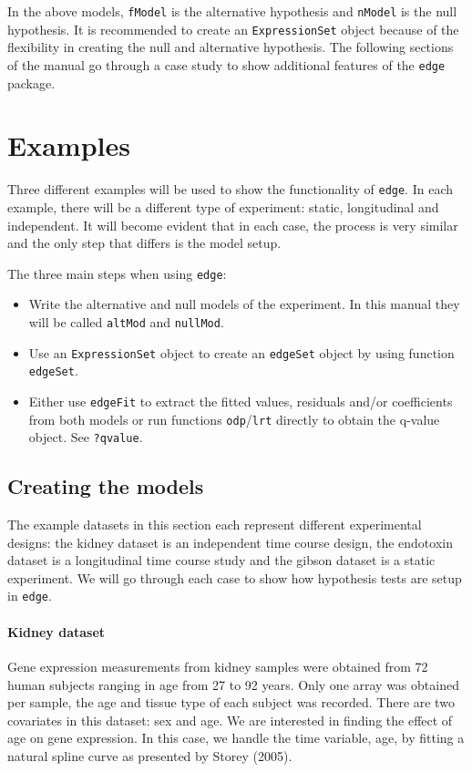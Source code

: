 \documentclass{article}\usepackage[]{graphicx}\usepackage[]{color}
\begin{document}
In the above models, {\tt fModel} is the alternative hypothesis and {\tt nModel} is the null hypothesis. It is recommended to create an {\tt ExpressionSet} object because of the flexibility in creating the null and alternative hypothesis. The following sections of the manual go through a case study to show additional features of the {\tt edge} package.

\section{Examples}
Three different examples will be used to show the functionality of {\tt edge}. 
In each example, there will be a different type of experiment: static, longitudinal and independent. It will become evident that in each case, the process is very similar and the only step that differs is the model setup.

The three main steps when using {\tt edge}:
\begin{itemize}
\item Write the alternative and null models of the experiment. In this manual they will be called {\tt altMod} and {\tt nullMod}. 
\item Use an {\tt ExpressionSet} object to create an {\tt edgeSet} object by using function {\tt edgeSet}. 
\item Either use {\tt edgeFit} to extract the fitted values, residuals and/or coefficients from both models or run functions {\tt odp}/{\tt lrt} directly to obtain the q-value object. See {\tt ?qvalue}.
\end{itemize}

\subsection{Creating the models}
The example datasets in this section each represent different experimental designs: the kidney dataset is an independent time course design, the endotoxin dataset is a longitudinal time course study and the gibson dataset is a static experiment. We will go through each case to show how hypothesis tests are setup in {\tt edge}. 

\paragraph{Kidney dataset} Gene expression measurements from kidney samples were obtained from 72 human subjects ranging in age from 27 to 92 years. Only one array was obtained per sample, the age and tissue type of each subject was recorded. There are two covariates in this dataset: sex and age. We are interested in finding the effect of age on gene expression. In this case, we handle the time variable, age, by fitting a natural spline curve as presented by Storey (2005).  
\end{document}
